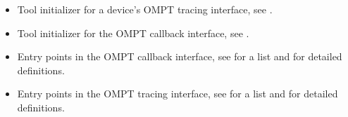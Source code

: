 \crossreferences
\begin{itemize}
\item Tool initializer for a device's OMPT tracing interface, 
see .

\item Tool initializer for the OMPT callback interface, 
see .

\item Entry points in the OMPT callback interface, see
   for a list and
   for detailed definitions.

\item Entry points in the OMPT tracing interface, see
   for a list and
   for detailed definitions.
\end{itemize}
